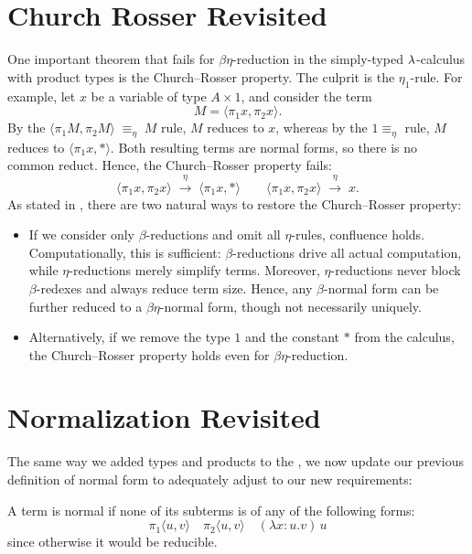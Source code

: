 \section{\centering Church Rosser Revisited}
One important theorem that fails for $\beta\eta$-reduction in the simply-typed 
$\lambda$-calculus with product types is the Church–Rosser property. The culprit is the 
$\eta_1$-rule. For example, let $x$ be a variable of type $A \times 1$, and consider 
the term 
\[
M = \langle \pi_1 x, \pi_2 x \rangle.
\] 
By the $  \langle \pi_1 M, \pi_2 M \rangle \;\equiv_\eta\; M $ rule, $M$ reduces to $x$, whereas by the $1 \equiv_\eta$ rule, 
$M$ reduces to $\langle \pi_1 x, *\rangle$. Both resulting terms are normal forms, 
so there is no common reduct. Hence, the Church–Rosser property fails:
\[
\langle \pi_1 x, \pi_2 x \rangle 
\;\overset{\eta}{\longrightarrow}\; \langle \pi_1 x, * \rangle \qquad
\langle \pi_1 x, \pi_2 x \rangle 
\;\overset{\eta}{\longrightarrow}\; x.
\]
As stated in \cite{selinger2008:lambdanotes}, there are two natural ways to restore the Church–Rosser property:
\begin{itemize}
  \label{items:restorech}
  \item If we consider only $\beta$-reductions and omit all $\eta$-rules, 
  confluence holds. Computationally, this is sufficient: $\beta$-reductions 
  drive all actual computation, while $\eta$-reductions merely simplify terms. 
  Moreover, $\eta$-reductions never block $\beta$-redexes and always reduce 
  term size. Hence, any $\beta$-normal form can be further reduced to a 
  $\beta\eta$-normal form, though not necessarily uniquely.

  \item Alternatively, if we remove the type $1$ and the constant $*$ from the 
  calculus, the Church–Rosser property holds even for $\beta\eta$-reduction.
\end{itemize}

\section{\centering Normalization Revisited}
\label{sec:typed-normalization}

The same way we added types and products to the \lcalc, we now update our previous definition of normal form to adequately adjust to our new requirements:
\begin{definition} A term is normal if none of its subterms is of any of the following forms:
  \label{def:prod-normal}
\[
\pi_1 \langle u, v \rangle \quad
\pi_2 \langle u, v \rangle \quad
(\lambda x: u . v)\, u
\]
since otherwise it would be reducible.
\end{definition}

